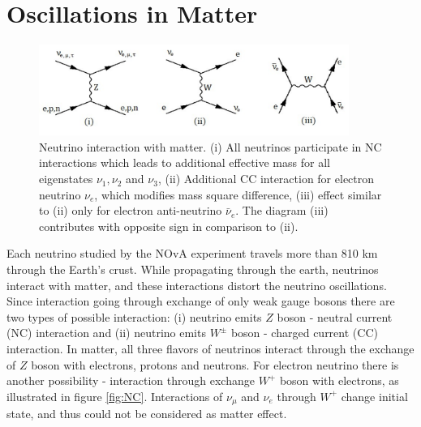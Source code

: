 \section{Oscillations in Matter}
\begin{figure}
\includegraphics[width=0.9\textwidth]{figures/NC_and_CC_currents.pdf}
\centering
\caption{Neutrino interaction with matter. (i) All neutrinos participate in NC interactions which 
leads to additional effective mass for all eigenstates $\nu_1, \nu_2$ and $\nu_3$, (ii) Additional 
CC interaction for electron neutrino $\nu_e$, which modifies mass square difference, (iii) effect 
similar to (ii) only for electron anti-neutrino $\bar{\nu}_e$. The diagram (iii) contributes with 
opposite sign in comparison to (ii).} 
\end{figure}

Each neutrino studied by the NOvA experiment travels more than 810 km through the Earth's crust.
While propagating through the earth, neutrinos interact with matter, and these interactions
distort the neutrino oscillations. Since interaction going through 
exchange of only weak gauge bosons there are two types of possible interaction: (i) neutrino 
emits $Z$ boson - neutral current (NC) interaction and (ii) neutrino emits $W^\pm$ boson - 
charged current (CC) interaction. In matter, all three flavors of neutrinos interact through 
the exchange of $Z$ boson with electrons, protons and neutrons. For electron neutrino there 
is another possibility - interaction through exchange $W^+$ boson with electrons, as illustrated  
in figure \ref{fig:NC}. Interactions of $\nu_\mu$ and $\nu_e$ through $W^{+}$ change initial 
state, and thus could not be considered as matter effect. 

